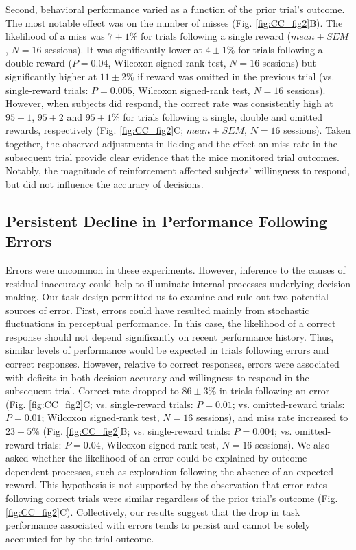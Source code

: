 Second, behavioral performance varied as a function of the prior trial’s outcome. The most notable effect was on the number of misses (Fig. \ref{fig:CC_fig2}B). The likelihood of a miss was $7 \pm 1\%$ for trials following a single reward ($mean \pm SEM$, $N = 16$ sessions). It was significantly lower at $4 \pm 1\%$ for trials following a double reward ($P = 0.04$, Wilcoxon signed-rank test, $N = 16$ sessions) but significantly higher at $11 \pm 2\%$ if reward was omitted in the previous trial (vs. single-reward trials: $P = 0.005$, Wilcoxon signed-rank test, $N = 16$ sessions). However, when subjects did respond, the correct rate was consistently high at $95 \pm 1$, $95 \pm 2$ and $95 \pm 1\%$ for trials following a single, double and omitted rewards, respectively (Fig. \ref{fig:CC_fig2}C; $mean \pm SEM$, $N = 16$ sessions). Taken together, the observed adjustments in licking and the effect on miss rate in the subsequent trial provide clear evidence that the mice monitored trial outcomes. Notably, the magnitude of reinforcement affected subjects’ willingness to respond, but did not influence the accuracy of decisions.

\subsection{Persistent Decline in Performance Following Errors}
Errors were uncommon in these experiments. However, inference to the causes of residual inaccuracy could help to illuminate internal processes underlying decision making. Our task design permitted us to examine and rule out two potential sources of error. First, errors could have resulted mainly from stochastic fluctuations in perceptual performance. In this case, the likelihood of a correct response should not depend significantly on recent performance history. Thus, similar levels of performance would be expected in trials following errors and correct responses. However, relative to correct responses, errors were associated with deficits in both decision accuracy and willingness to respond in the subsequent trial. Correct rate dropped to $86 \pm 3\%$ in trials following an error (Fig. \ref{fig:CC_fig2}C; vs. single-reward trials: $P = 0.01$; vs. omitted-reward trials: $P = 0.01$; Wilcoxon signed-rank test, $N = 16$ sessions), and miss rate increased to $23 \pm 5\%$ (Fig. \ref{fig:CC_fig2}B; vs. single-reward trials: $P = 0.004$; vs. omitted-reward trials: $P = 0.04$, Wilcoxon signed-rank test, $N = 16$ sessions). We also asked whether the likelihood of an error could be explained by outcome-dependent processes, such as exploration following the absence of an expected reward. This hypothesis is not supported by the observation that error rates following correct trials were similar regardless of the prior trial’s outcome (Fig. \ref{fig:CC_fig2}C). Collectively, our results suggest that the drop in task performance associated with errors tends to persist and cannot be solely accounted for by the trial outcome.

